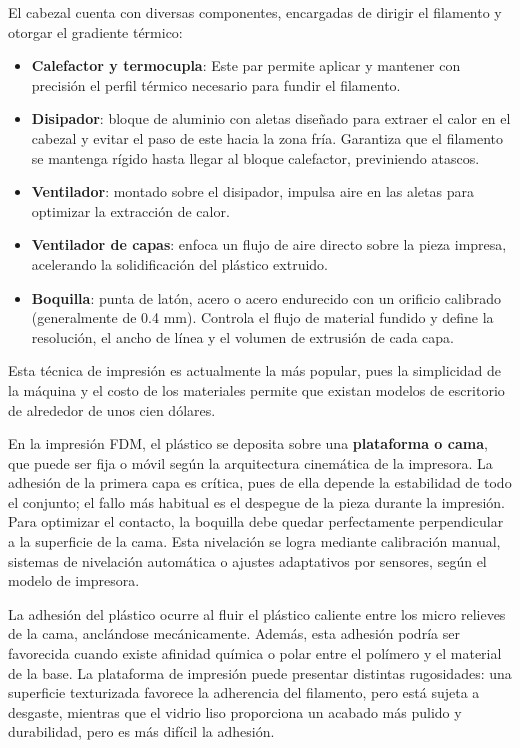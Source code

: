 El cabezal cuenta con diversas componentes, encargadas de dirigir el filamento y otorgar el gradiente térmico:

\begin{itemize}
  \item \textbf{Calefactor y termocupla}: Este par permite aplicar y mantener con precisión el perfil térmico necesario para fundir el filamento.

  \item \textbf{Disipador}: bloque de aluminio con aletas diseñado para extraer el calor en el cabezal y evitar el paso de este hacia la zona fría. Garantiza que el filamento se mantenga rígido hasta llegar al bloque calefactor, previniendo atascos.

  \item \textbf{Ventilador}: montado sobre el disipador, impulsa aire en las aletas para optimizar la extracción de calor. 

  \item \textbf{Ventilador de capas}: enfoca un flujo de aire directo sobre la pieza impresa, acelerando la solidificación del plástico extruido. 

  \item \textbf{Boquilla}: punta de latón, acero o acero endurecido con un orificio calibrado (generalmente de 0.4 mm). Controla el flujo de material fundido y define la resolución, el ancho de línea y el volumen de extrusión de cada capa.
\end{itemize}

Esta técnica de impresión es actualmente la más popular, pues la simplicidad de la máquina y el costo de los materiales permite que existan modelos de escritorio de alrededor de unos cien dólares.

En la impresión FDM, el plástico se deposita sobre una \textbf{plataforma o cama}, que puede ser fija o móvil según la arquitectura cinemática de la impresora. La adhesión de la primera capa es crítica, pues de ella depende la estabilidad de todo el conjunto; el fallo más habitual es el despegue de la pieza durante la impresión. Para optimizar el contacto, la boquilla debe quedar perfectamente perpendicular a la superficie de la cama. Esta nivelación se logra mediante calibración manual, sistemas de nivelación automática o ajustes adaptativos por sensores, según el modelo de impresora. 

La adhesión del plástico ocurre al fluir el plástico caliente entre los micro relieves de la cama, anclándose mecánicamente. Además, esta adhesión podría ser favorecida cuando existe afinidad química o polar entre el polímero y el material de la base. La plataforma de impresión puede presentar distintas rugosidades: una superficie texturizada favorece la adherencia del filamento, pero está sujeta a desgaste, mientras que el vidrio liso proporciona un acabado más pulido y durabilidad, pero es más difícil la adhesión.

